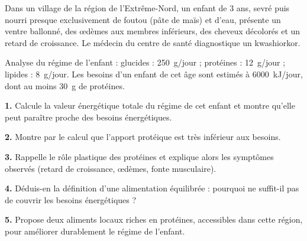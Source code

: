 \documentclass[11pt]{article}
\begin{document}
\begin{exercice}
Dans un village de la région de l'Extrême-Nord, un enfant de 3 ans, sevré puis nourri presque exclusivement de foutou (pâte de maïs) et d'eau, présente un ventre ballonné, des œdèmes aux membres inférieurs, des cheveux décolorés et un retard de croissance. Le médecin du centre de santé diagnostique un kwashiorkor.

Analyse du régime de l'enfant : glucides : \SI{250}{g/jour} ; protéines : \SI{12}{g/jour} ; lipides : \SI{8}{g/jour}. Les besoins d'un enfant de cet âge sont estimés à \SI{6000}{kJ/jour}, dont au moins \SI{30}{g} de protéines.

\textbf{1.} Calcule la valeur énergétique totale du régime de cet enfant et montre qu'elle peut paraître proche des besoins énergétiques.

\textbf{2.} Montre par le calcul que l'apport protéique est très inférieur aux besoins.

\textbf{3.} Rappelle le rôle plastique des protéines et explique alors les symptômes observés (retard de croissance, œdèmes, fonte musculaire).

\textbf{4.} Déduis-en la définition d'une alimentation équilibrée : pourquoi ne suffit-il pas de couvrir les besoins énergétiques ?

\textbf{5.} Propose deux aliments locaux riches en protéines, accessibles dans cette région, pour améliorer durablement le régime de l'enfant.
\end{exercice}
\end{document}
